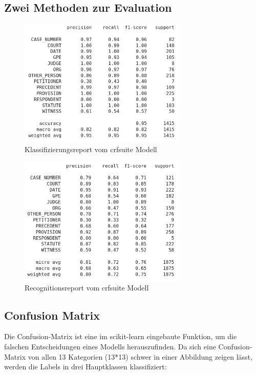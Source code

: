 \documentclass[paper=A4, ngerman, fontsize=12pt]{article}
\begin{document}
	\subsection{Zwei Methoden zur Evaluation}
\begin{figure}
	\begin{center}
		\includegraphics[width=8cm]{Illustrations/crf_classify.png}
		\caption{Klassifizierungsreport vom crfsuite Modell}
		\label{Klassifizierungsreport vom crfsuite Modell}
	\end{center}
\end{figure}

\begin{figure}
	\begin{center}
		\includegraphics[width=8cm]{Illustrations/crf_recognition.png}
		\caption{Recognitionsreport vom crfsuite Modell}
		\label{Recognitionsreport vom crfsuite Modell}
	\end{center}
\end{figure}

	\subsection{Confusion Matrix}
	\noindent
	Die Confusion-Matrix ist eine im scikit-learn eingebaute Funktion, um die falschen Entscheidungen eines Modells herauszufinden. Da sich eine Confusion-Matrix von allen 13 Kategorien (13*13) schwer in einer Abbildung zeigen lässt,  werden die Labels in drei Hauptklassen klassifiziert:
	
\end{document}
